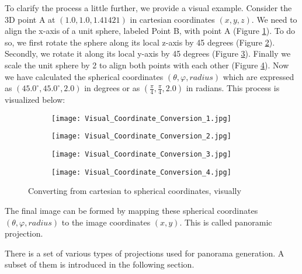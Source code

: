 To clarify the process a little further, we provide a visual example. Consider the 3D point A at {$(1.0, 1.0, 1.41421)$}  in cartesian coordinates {$(x, y, z)$}. We need to align the x-axis of a unit sphere, labeled Point B, with point A (Figure \ref{fig:visual_coordinate_conversion_1}). To do so, we first rotate the sphere along its local z-axis by 45 degrees (Figure \ref{fig:visual_coordinate_conversion_2}). Secondly, we rotate it along its local y-axis by 45 degrees (Figure \ref{fig:visual_coordinate_conversion_3}). Finally we scale the unit sphere by 2 to align both points with each other (Figure \ref{fig:visual_coordinate_conversion_4}). Now we have calculated the spherical coordinates {$(\theta, \varphi, radius)$} which are expressed as {$(45.0^{\circ}, 45.0^{\circ}, 2.0)$} in degrees or as {$(\frac{\pi}{4}, \frac{\pi}{4}, 2.0)$} in radians. This process is visualized below:

\begin{figure}[h]
	\centering
	\begin{subfigure}[b]{0.24\textwidth}
		\centering
		\texttt{[image: Visual\_Coordinate\_Conversion\_1.jpg]}
		\caption{}
		\label{fig:visual_coordinate_conversion_1}
	\end{subfigure}
	\hfill
	\begin{subfigure}[b]{0.24\textwidth}
		\centering
		\texttt{[image: Visual\_Coordinate\_Conversion\_2.jpg]}
		\caption{}
		\label{fig:visual_coordinate_conversion_2}
	\end{subfigure}
	\hfill
	\begin{subfigure}[b]{0.24\textwidth}
		\centering
		\texttt{[image: Visual\_Coordinate\_Conversion\_3.jpg]}
		\caption{}
		\label{fig:visual_coordinate_conversion_3}
	\end{subfigure}
	\hfill
	\begin{subfigure}[b]{0.24\textwidth}
		\centering
		\texttt{[image: Visual\_Coordinate\_Conversion\_4.jpg]}
		\caption{}
		\label{fig:visual_coordinate_conversion_4}
	\end{subfigure}
	
	\caption{Converting from cartesian to spherical coordinates, visually}
	\label{fig:converting_cartesian_to_spherical}
\end{figure}

The final image can be formed by mapping these spherical coordinates {$(\theta, \varphi, radius)$} to the image coordinates {$(x, y)$}. This is called panoramic projection.

There is a set of various types of projections used for panorama generation. A subset of them is introduced in the following section.

